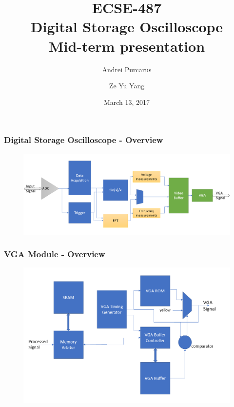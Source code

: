 \documentclass{beamer}
\title{\textbf{ECSE-487 \\ Digital Storage Oscilloscope \\ Mid-term presentation}}
\author{Andrei Purcarus \and Ze Yu Yang}
\date{March 13, 2017}
\begin{document}
\maketitle

\begin{frame}
\frametitle{Digital Storage Oscilloscope - Overview}

\begin{figure}[!htb]
  \includegraphics[width=\linewidth]{system_diagram.png}
\end{figure}

\end{frame}

\begin{frame}
\frametitle{VGA Module - Overview}

\begin{figure}[!htb]
  \includegraphics[width=\linewidth]{VGA_diagram.png}
\end{figure}

\end{frame}
\end{document}
